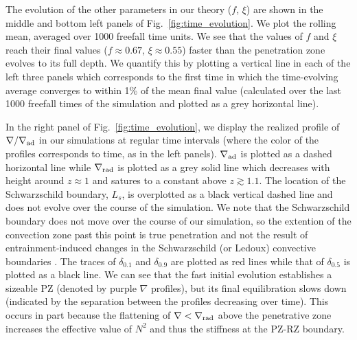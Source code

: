 \documentclass{aastex631}
\newcommand{\gradrad}{\ensuremath{\nabla_{\rm{rad}}}}
\newcommand{\gradad}{\ensuremath{\nabla_{\rm{ad}}}}
\newcommand{\justgrad}{\ensuremath{\nabla}}
\begin{document}
The evolution of the other parameters in our theory ($f$, $\xi$) are shown in the middle and bottom left panels of Fig.~\ref{fig:time_evolution}.
We plot the rolling mean, averaged over 1000 freefall time units. 
We see that the values of $f$ and $\xi$ reach their final values ($f \approx 0.67$, $\xi \approx 0.55$) faster than the penetration zone evolves to its full depth.
We quantify this by plotting a vertical line in each of the left three panels which corresponds to the first time in which the time-evolving average converges to within 1\% of the mean final value (calculated over the last 1000 freefall times of the simulation and plotted as a grey horizontal line).

In the right panel of Fig.~\ref{fig:time_evolution}, we display the realized profile of $\justgrad/\gradad$ in our simulations at regular time intervals (where the color of the profiles corresponds to time, as in the left panels).
$\gradad$ is plotted as a dashed horizontal line while $\gradrad$ is plotted as a grey solid line which decreases with height around $z \approx 1$ and satures to a constant above $z \gtrsim 1.1$.
The location of the Schwarzschild boundary, $L_s$, is overplotted as a black vertical dashed line and does not evolve over the course of the simulation.
We note that the Schwarzschild boundary does not move over the course of our simulation, so the extention of the convection zone past this point is true penetration and not the result of entrainment-induced changes in the Schwarzschild (or Ledoux) convective boundaries \citep[as studied in e.g.,][]{horst_etal_2021}.
The traces of $\delta_{0.1}$ and $\delta_{0.9}$ are plotted as red lines while that of $\delta_{0.5}$ is plotted as a black line.
We can see that the fast initial evolution establishes a sizeable PZ (denoted by purple $\justgrad$ profiles), but its final equilibration slows down (indicated by the separation between the profiles decreasing over time).
This occurs in part because the flattening of $\justgrad < \gradrad$ above the penetrative zone increases the effective value of $N^2$ and thus the stiffness at the PZ-RZ boundary.
\end{document}
